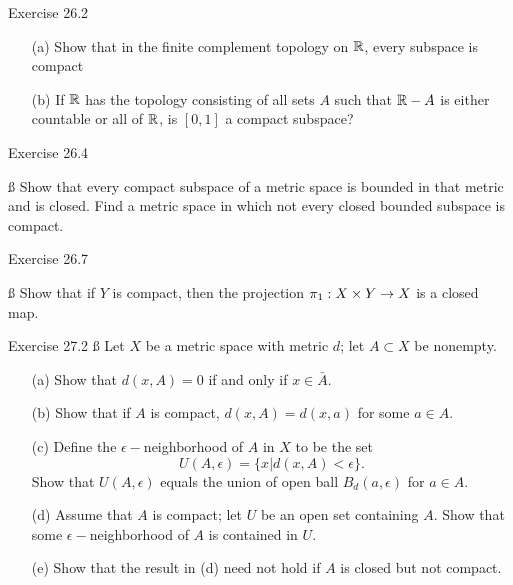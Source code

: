 \documentclass{hmwk}
\begin{document}
\maketitle

\begin{problem}{Exercise 26.2}
    \begin{itemize}
        \item[(a)] Show that in the finite complement topology on $\mathbb{R}$, every subspace is compact
        \item[(b)] If $\mathbb{R}$ has the topology consisting of all sets $A$ such that $\mathbb{R} - A$ is either countable or all of $\mathbb{R}$, is $[0, 1]$ a compact subspace?
    \end{itemize}
\end{problem}

\begin{solution}

\end{solution}

\begin{problem}{Exercise 26.4}

    \ss
    \noindent Show that every compact subspace of a metric space is bounded in that metric and is closed. Find a metric space in which not every closed bounded subspace is compact.
\end{problem}

\begin{solution}
    
\end{solution}

\begin{problem}{Exercise 26.7}

    \ss
    \noindent Show that if $Y$ is compact, then the projection $\pi_1: X \times Y \rightarrow X$ is a closed map. 
\end{problem}

\begin{solution}
    
\end{solution}

\begin{problem}{Exercise 27.2}
    \ss
    \noindent Let $X$ be a metric space with metric $d$; let $A \subset X$ be nonempty. 
    \begin{itemize}
        \item[(a)] Show that $d(x, A) = 0$ if and only if $x \in \bar{A}$.
        \item[(b)] Show that if $A$ is compact, $d(x, A) = d(x, a)$ for some $a \in A$. 
        \item[(c)] Define the $\epsilon-$neighborhood of $A$ in $X$ to be the set $$U(A, \epsilon) = \{x | d(x, A) < \epsilon\}.$$ Show that $U(A, \epsilon)$ equals the union of open ball $B_d(a, \epsilon)$ for $a \in A$. 
        \item[(d)] Assume that $A$ is compact; let $U$ be an open set containing $A$. Show that some $\epsilon-$neighborhood of $A$ is contained in $U$.
        \item[(e)] Show that the result in (d) need not hold if $A$ is closed but not compact. 
    \end{itemize}
\end{problem}
\end{document}
